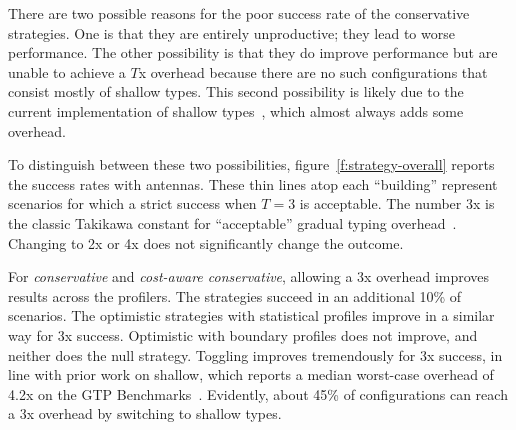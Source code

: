 There are two possible reasons for the poor success rate of the conservative
strategies.
One is that they are entirely unproductive; they lead to worse performance.
The other possibility is that they do improve performance but are unable
to achieve a $T$x overhead because there are no such configurations that
consist mostly of shallow types.
This second possibility is likely due to the current implementation of shallow
types~\cite{g-deep-shallow}, which almost always adds some overhead.

To distinguish between these two possibilities, figure~\ref{f:strategy-overall}
reports the success rates with antennas. These thin lines atop each ``building''
represent scenarios for which a strict success when $T = 3$ is acceptable.  The
number 3x is the classic Takikawa constant for ``acceptable'' gradual typing
overhead~\cite{vss-popl-2017,bbst-oopsla-2017}.  Changing to 2x or 4x does not
significantly change the outcome.

For \emph{conservative} and \emph{cost-aware conservative}, allowing a 3x
overhead improves results across the profilers. The strategies succeed in an
additional 10\% of scenarios.  The optimistic strategies with statistical profiles
improve in a similar way for 3x success.  Optimistic with boundary profiles does
not improve, and neither does the null strategy.  Toggling
improves tremendously for 3x success, in line with prior work on shallow, which
reports a median worst-case overhead of 4.2x on the GTP
Benchmarks~\cite{g-deep-shallow}.  Evidently, about 45\% of configurations can
reach a 3x overhead by switching to shallow types.

